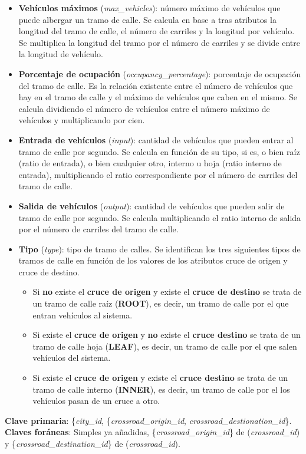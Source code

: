 \begin{itemize}
    \item \textbf{Vehículos máximos} (\textit{max\_vehicles}): número máximo de vehículos que puede albergar un tramo de calle. Se calcula en base a tras atributos la longitud del tramo de calle, el número de carriles y la longitud por vehículo. Se multiplica la longitud del tramo por el número de carriles y se divide entre la longitud de vehículo.
    \item \textbf{Porcentaje de ocupación} (\textit{occupancy\_percentage}): porcentaje de ocupación del tramo de calle. Es la relación existente entre el número de vehículos que hay en el tramo de calle y el máximo de vehículos que caben en el mismo. Se calcula dividiendo el número de vehículos entre el número máximo de vehículos y multiplicando por cien.
    \item \textbf{Entrada de vehículos} (\textit{input}): cantidad de vehículos que pueden entrar al tramo de calle por segundo. Se calcula en función de su tipo, si es, o bien raíz (ratio de entrada), o bien cualquier otro, interno u hoja (ratio interno de entrada), multiplicando el ratio correspondiente por el número de carriles del tramo de calle.
    \item \textbf{Salida de vehículos} (\textit{output}): cantidad de vehículos que pueden salir de tramo de calle por segundo. Se calcula multiplicando el ratio interno de salida por el número de carriles del tramo de calle.
    \item \textbf{Tipo} (\textit{type}): tipo de tramo de calles. Se identifican los tres siguientes tipos de tramos de calle en función de los valores de los atributos cruce de origen y cruce de destino.
    \begin{itemize}
        \item Si \textbf{no} existe el \textbf{cruce de origen} y existe el \textbf{cruce de destino} se trata de un tramo de calle raíz (\textbf{ROOT}), es decir, un tramo de calle por el que entran vehículos al sistema.
        \item Si existe el \textbf{cruce de origen} y \textbf{no} existe el \textbf{cruce destino} se trata de un tramo de calle hoja (\textbf{LEAF}), es decir, un tramo de calle por el que salen vehículos del sistema.
        \item Si existe el \textbf{cruce de origen} y existe el \textbf{cruce destino} se trata de un tramo de calle interno (\textbf{INNER}), es decir, un tramo de calle por el los vehículos pasan de un cruce a otro.
    \end{itemize}
\end{itemize}
\textbf{Clave primaria}: \{\textit{city\_id}, \{\textit{crossroad\_origin\_id}, \textit{crossroad\_destionation\_id}\}. \\
\textbf{Claves foráneas}: Simples ya añadidas, \{\textit{crossroad\_origin\_id}\} de (\textit{crossroad\_id}) y \{\textit{crossroad\_destination\_id}\} de (\textit{crossroad\_id}).

